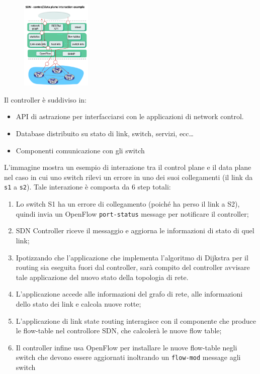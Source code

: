 \begin{figure}[htbp]
   \centering
   \includegraphics[width=0.3\textwidth]{images/questions/Schermata del 2023-11-02 17-04-24.png}
   \label{fig:dom2.11}
\end{figure}

Il controller è suddiviso in:
\begin{itemize}
    \item  API di astrazione per interfacciarsi con le applicazioni di network control.
    \item Database distribuito su stato di link, switch, servizi, ecc\dots
    \item Componenti comunicazione con gli switch
\end{itemize}

L'immagine mostra un esempio di interazione tra il control plane e il data plane nel caso in cui uno switch rilevi un errore in uno dei suoi collegamenti (il link da \texttt{s1} a \texttt{s2}). Tale interazione è composta da 6 step totali:

\begin{enumerate}
\item Lo switch S1 ha un errore di collegamento (poiché ha perso il link a S2), quindi invia un OpenFlow \texttt{port-status} message per notificare il controller;
\item SDN Controller riceve il messaggio e aggiorna le informazioni di stato di quel link;
\item Ipotizzando che l'applicazione che implementa l'algoritmo di Dijkstra per il routing sia eseguita fuori dal controller, sarà compito del controller avvisare tale applicazione del nuovo stato della topologia di rete.
\item L'applicazione accede alle informazioni del grafo di rete, alle informazioni dello stato dei link e calcola nuove rotte;
\item L'applicazione di link state routing interagisce con il componente che produce le flow-table nel controllore SDN, che calcolerà le nuove flow table;
\item Il controller infine usa OpenFlow per installare le nuove flow-table negli switch che devono essere aggiornati inoltrando un \texttt{flow-mod} message agli switch
\end{enumerate}


